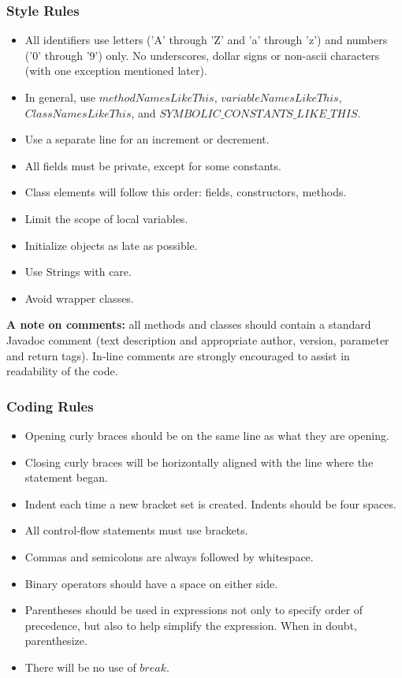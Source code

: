 \documentclass[12pt]{article}
\newenvironment{itemize*}%
  {\begin{itemize}%
  	\setlength{\parsep}{0pt}
    \setlength{\itemsep}{0pt}%
    \setlength{\parskip}{0pt}}%
  {\end{itemize}}
\begin{document}
\begin{itemize*}
\subsubsection{Style Rules}
\begin{itemize}
\item All identifiers use letters ('A' through 'Z' and 'a' through 'z') and numbers ('0' through '9') only. No underscores, dollar signs or non-ascii characters (with one exception mentioned later).
\item In general, use $methodNamesLikeThis$, $variableNamesLikeThis$, $ClassNamesLikeThis$, and $SYMBOLIC\_CONSTANTS\_LIKE\_THIS$.
\item Use a separate line for an increment or decrement.
\item All fields must be private, except for some constants.
\item Class elements will follow this order: fields, constructors, methods. 
\item Limit the scope of local variables.
\item Initialize objects as late as possible.
\item Use Strings with care.
\item Avoid wrapper classes.
\end{itemize}
\textbf{A note on comments:} all methods and classes should contain a standard Javadoc comment (text description and appropriate author, version, parameter and return tags).  In-line comments are strongly encouraged to assist in readability of the code.

\subsubsection{Coding Rules}
\begin{itemize}
\item Opening curly braces should be on the same line as what they are opening.
\item Closing curly braces will be horizontally aligned with the line where the statement began.
\item Indent each time a new bracket set is created.  Indents should be four spaces.
\item All control-flow statements must use brackets.
\item Commas and semicolons are always followed by whitespace.
\item Binary operators should have a space on either side.
\item Parentheses should be used in expressions not only to specify order of precedence, but also to help simplify the expression. When in doubt, parenthesize. 
\item There will be no use of $break$.
\end{itemize}



\end{itemize*}
\end{document}
